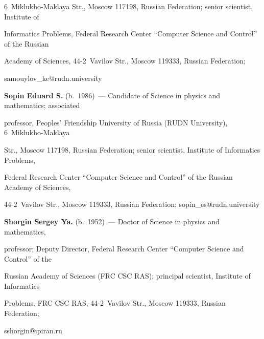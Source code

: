 6~Miklukho-Maklaya Str., Moscow 117198, Russian Federation; senior scientist, Institute of 

Informatics Problems, Federal Research Center ``Computer Science and Control'' of the Russian 

Academy of Sciences, 44-2~Vavilov Str., Moscow 119333, Russian Federation;  

\mbox{samouylov\_ke@rudn.university} 



\vspace*{3pt}



\noindent

\textbf{Sopin Eduard S.} (b.\ 1986)~--- Candidate of Science in physics and mathematics; associated 

professor, Peoples' Friendship University of Russia (RUDN University), 6~Miklukho-Maklaya 

Str., Moscow 117198, Russian Federation; senior scientist, Institute of Informatics Problems, 

Federal Research Center ``Computer Science and Control'' of the Russian Academy of Sciences, 

44-2~Vavilov Str., Moscow 119333, Russian Federation; \mbox{sopin\_es@rudn.university} 



\vspace*{3pt}



\noindent

\textbf{Shorgin Sergey Ya.} (b.\ 1952)~--- Doctor of Science in physics and mathematics, 

professor; Deputy Director, Federal Research Center ``Computer Science and Control'' of the 

Russian Academy of Sciences (FRC CSC RAS); principal scientist, Institute of Informatics 

Problems, FRC CSC RAS, 44-2~Vavilov Str., Moscow 119333, Russian Federation; 

\mbox{sshorgin@ipiran.ru}  

\label{end\stat}





\renewcommand{\bibname}{\protect\rm Литература} 

